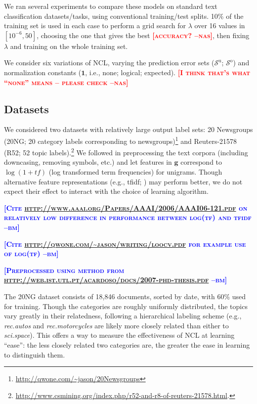 \documentclass{article} %
\newcommand{\unorderedS}{\mathcal{S}^{\mathrm{u}}}
\newcommand{\orderedS}{\mathcal{S}^{\mathrm{o}}}
\newcommand{\ourmethod}{NCL}
\newcommand{\bmcomment}[1]{\textcolor{blue}{\textsc{\textbf{[#1 --bm]}}}}
\newcommand{\nascomment}[1]{\textcolor{red}{\textsc{\textbf{[#1 --nas]}}}}
\begin{document}
We ran several experiments to compare these models on standard text
classification datasets/tasks, using conventional training/test splits.
10\% of the training set is used in each case to perform a grid search
for $\lambda$ over 16 values in $[10^{-6}, 50]$, choosing the one that
gives the best \nascomment{accuracy?}, then fixing $\lambda$ and
training on the whole training set.

We consider six variations of \ourmethod{}, varying the prediction error sets
($\unorderedS$; $\orderedS$) and normalization constants
($\boldsymbol{1}$, i.e., none; logical; expected). \nascomment{I think
  that's what ``none'' means -- please check}

\subsection{Datasets}

We considered two datasets with relatively large output label sets:
20 Newsgroups (20NG; 20 category labels corresponding to newsgroups)\footnote{\url{http://qwone.com/~jason/20Newsgroups}} and Reuters-21578
(R52; 52 topic labels).\footnote{\url{http://www.csmining.org/index.php/r52-and-r8-of-reuters-21578.html}.}    We followed \citep{acardoso-thesis} in
preprocessing the text corpora (including downcasing, removing
symbols, etc.) and let features in $\mathbf{g}$ correspond to $\log (1
+ \mathit{tf})$ (log transformed term frequencies) for unigrams.
Though alternative feature
representations (e.g., tfidf; \citep{lan-lan-lo}) may perform better, we do not expect
their effect to interact with the choice of learning algorithm.

\bmcomment{Cite \url{http://www.aaai.org/Papers/AAAI/2006/AAAI06-121.pdf}
on relatively low difference in performance between log(tf) and tfidf}

\bmcomment{Cite \url{http://qwone.com/~jason/writing/loocv.pdf} for 
example use of log(tf)}

\bmcomment{Preprocessed using method from 
\url{http://web.ist.utl.pt/acardoso/docs/2007-phd-thesis.pdf}}

The 20NG dataset consists of 18,846 documents, sorted by date, with
60\% used for training.  Though the categories are roughly uniformly
distributed, the topics vary greatly in their relatedness, following a
hierarchical labeling scheme (e.g., \emph{rec.autos} and
\emph{rec.motorcycles} are likely more closely related than either to
\emph{sci.space}).  This offers a way to measure the effectiveness of
\ourmethod{} at learning ``ease'':   the less closely related two categories
are, the greater the ease in learning to distinguish them.
\end{document}

